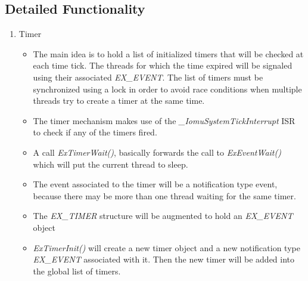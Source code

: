 \documentclass{report}
\begin{document}
\subsection{Detailed Functionality}
\begin{enumerate}
    \item Timer
        \begin{itemize}
            \item The main idea is to hold a list of initialized timers that will be checked at each time tick. The threads for which the time expired
            will be signaled using their associated \textit{EX\_EVENT}. The list of timers must be synchronized using a lock in order to avoid race conditions
            when multiple threads try to create a timer at the same time.
            \item The timer mechanism makes use of the \textit{\_IomuSystemTickInterrupt} ISR to check if any of the timers fired.
            \item A call \textit{ExTimerWait()}, basically forwards the call to \textit{ExEventWait()} which will put the current thread to sleep.
            \item The event associated to the timer will be a notification type event, because there may be more than one thread waiting for the same timer.
            \item The \textit{EX\_TIMER} structure will be augmented to hold an \textit{EX\_EVENT} object 
            \item \textit{ExTimerInit()} will create a new timer object and a new notification type \textit{EX\_EVENT} associated with it. Then the new
            timer will be added into the global list of timers.
        \end{itemize}
    

\end{enumerate}
\end{document}
